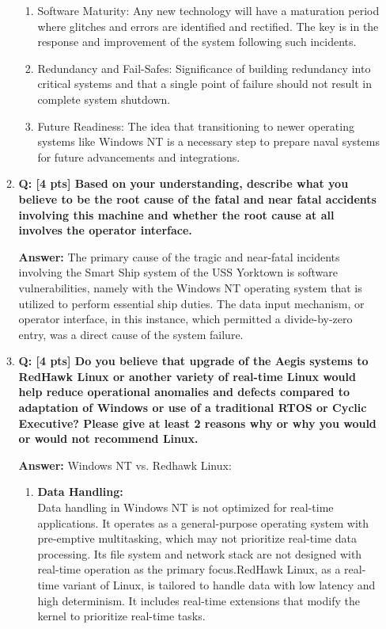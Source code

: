 \documentclass[a4paper,11pt]{article}%
\newenvironment{qanda}{\setlength{\parindent}{0pt}}{\bigskip}
\newcommand{\Q}{\bigskip\bfseries Q: }
\newcommand{\A}{\par\textbf{Answer: } \normalfont}
\begin{document}
\begin{qanda}
\begin{enumerate}
\begin{enumerate}
\begin{enumerate}
					      \item Software Maturity: Any new technology will have a maturation period where glitches and errors are identified and rectified. The key is in the response and improvement of the system following such incidents.

					      \item Redundancy and Fail-Safes: Significance of building redundancy into critical systems and that a single point of failure should not result in complete system shutdown.

					      \item Future Readiness: The idea that transitioning to newer operating systems like Windows NT is a necessary step to prepare naval systems for future advancements and integrations.

				      \end{enumerate}
				\item \Q [4 pts] Based on your understanding, describe what you believe to be the root cause of
				      the fatal and near fatal accidents involving this machine and whether the root cause at all
				      involves the operator interface.
				      \A The primary cause of the tragic and near-fatal incidents involving the Smart Ship system of the USS Yorktown is software vulnerabilities, namely with the Windows NT operating system that is utilized to perform essential ship duties. The data input mechanism, or operator interface, in this instance, which permitted a divide-by-zero entry, was a direct cause of the system failure.
				\item \Q [4 pts] Do you believe that upgrade of the Aegis systems to RedHawk Linux or another
				      variety of real-time Linux would help reduce operational anomalies and defects
				      compared to adaptation of Windows or use of a traditional RTOS or Cyclic Executive?
				      Please give at least 2 reasons why or why you would or would not recommend Linux.
				      \A Windows NT vs. Redhawk Linux:
				      \begin{enumerate}
					      \item \textbf{Data Handling:}\\
					            Data handling in Windows NT is not optimized for real-time applications. It operates as a general-purpose operating system with pre-emptive multitasking, which may not prioritize real-time data processing. Its file system and network stack are not designed with real-time operation as the primary focus.RedHawk Linux, as a real-time variant of Linux, is tailored to handle data with low latency and high determinism. It includes real-time extensions that modify the kernel to prioritize real-time tasks.

\end{enumerate}
\end{enumerate}
\end{enumerate}
\end{qanda}
\end{document}
